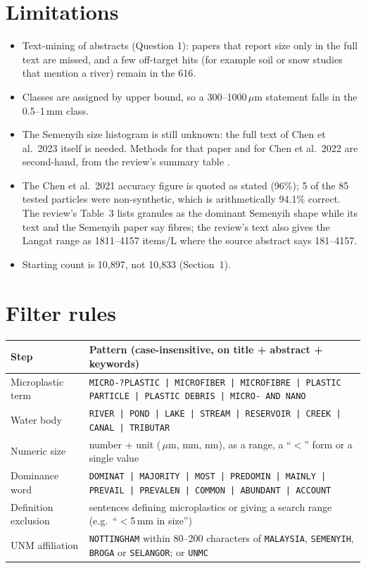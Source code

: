 \documentclass[11pt,a4paper]{article}
\newcommand{\um}{\,\ensuremath{\mu}m}
\begin{document}
\section{Limitations}
\begin{itemize}
\item Text-mining of abstracts (Question 1): papers that report size only in the full text are missed, and a few off-target hits (for example soil or snow studies that mention a river) remain in the 616.
\item Classes are assigned by upper bound, so a 300--1000\um{} statement falls in the 0.5--1\,mm class.
\item The Semenyih size histogram is still unknown: the full text of Chen et al.\ 2023 itself is needed. Methods for that paper and for Chen et al.\ 2022 are second-hand, from the review's summary table \cite{bouida26}.\item The Chen et al.\ 2021 accuracy figure is quoted as stated (96\%); 5 of the 85 tested particles were non-synthetic, which is arithmetically 94.1\% correct. The review's Table~3 lists granules as the dominant Semenyih shape while its text and the Semenyih paper say fibres; the review's text also gives the Langat range as 1811--4157 items/L where the source abstract says 181--4157.
\item Starting count is 10,897, not 10,833 (Section~1).
\end{itemize}

\appendix
\section{Filter rules}\label{app:rules}
\begin{table}[H]\centering\scriptsize
\begin{tabularx}{\textwidth}{@{}p{3.4cm}X@{}}
\toprule Step & Pattern (case-insensitive, on title + abstract + keywords) \\\midrule
Microplastic term & \texttt{MICRO-?PLASTIC | MICROFIBER | MICROFIBRE | PLASTIC PARTICLE | PLASTIC DEBRIS | MICRO- AND NANO} \\
Water body & \texttt{RIVER | POND | LAKE | STREAM | RESERVOIR | CREEK | CANAL | TRIBUTAR} \\
Numeric size & number + unit (\um, mm, nm), as a range, a ``$<$'' form or a single value \\
Dominance word & \texttt{DOMINAT | MAJORITY | MOST | PREDOMIN | MAINLY | PREVAIL | PREVALEN | COMMON | ABUNDANT | ACCOUNT} \\
Definition exclusion & sentences defining microplastics or giving a search range (e.g.\ ``$<$5\,mm in size'') \\
UNM affiliation & \texttt{NOTTINGHAM} within 80--200 characters of \texttt{MALAYSIA}, \texttt{SEMENYIH}, \texttt{BROGA} or \texttt{SELANGOR}; or \texttt{UNMC} \\
\bottomrule\end{tabularx}
\end{table}
\end{document}
